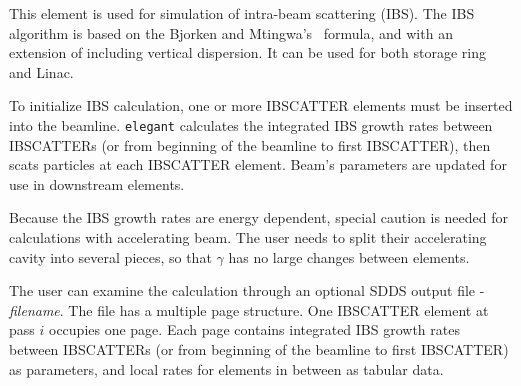 This element is used for simulation of intra-beam scattering
(IBS). The IBS algorithm is based on the Bjorken and
Mtingwa's~\cite{BM} formula, and with an extension of including
vertical dispersion. It can be used for both storage ring and Linac.

To initialize IBS calculation, one or more IBSCATTER elements must be
inserted into the beamline. {\tt elegant} calculates the integrated
IBS growth rates between IBSCATTERs (or from beginning of the beamline
to first IBSCATTER), then scats particles at each IBSCATTER
element. Beam's parameters are updated for use in downstream elements.

Because the IBS growth rates are energy dependent, special caution is
needed for calculations with accelerating beam. The user needs to
split their accelerating cavity into several pieces, so that $\gamma$
has no large changes between elements.

The user can examine the calculation through an optional SDDS output
file - {\it filename}. The file has a multiple page structure. One
IBSCATTER element at pass $i$ occupies one page. Each page contains
integrated IBS growth rates between IBSCATTERs (or from beginning of
the beamline to first IBSCATTER) as parameters, and local rates for
elements in between as tabular data.
